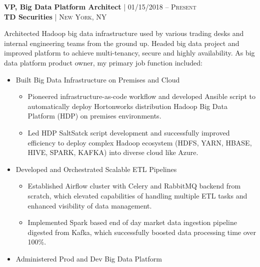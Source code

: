 {\raggedright\normalsize
\textbf{VP, Big Data Platform Architect} {\hfill\footnotesize\textsc{| 01/15/2018 -- Present}}\\ 
\textbf{TD Securities} {\hfill\footnotesize\textsc{| New York, NY}}}
\setlength\vspace{0pt}

\begin{flushleft}
Architected Hadoop big data infrastructure used by various trading desks and internal engineering teams from the ground up.
Headed big data project and improved platform to achieve multi-tenancy, secure and highly availability. 
As big data platform product owner, my primary job function included:  
\end{flushleft}

\begin{itemize}[leftmargin=*, topsep=1pt, partopsep=2.5pt]
\setlength\itemsep{-0.2em}

\item Built Big Data Infrastructure on Premises and Cloud

\begin{itemize}[leftmargin=*, topsep=-5pt, partopsep=2.5pt]
\setlength\itemsep{-0.2em}
\item Pioneered infrastructure-as-code workflow and developed Ansible script to automatically deploy Hortonworks distribution Hadoop Big Data Platform (HDP) on premises environments.  
\item Led HDP SaltSatck script development and successfully improved efficiency to deploy complex Hadoop ecosystem (HDFS, YARN, HBASE, HIVE, SPARK, KAFKA) into diverse cloud like Azure.
\end{itemize}

\item Developed and Orchestrated Scalable ETL Pipelines

\begin{itemize}[leftmargin=*, topsep=-5pt, partopsep=2.5pt]
\setlength\itemsep{-0.2em}
\item Established Airflow cluster with Celery and RabbitMQ backend from scratch, which elevated capabilities of handling multiple ETL tasks and enhanced visibility of data management.
\item Implemented Spark based end of day market data ingestion pipeline digested from Kafka, which successfully boosted data processing time over 100\%.
\end{itemize}

\item Administered Prod and Dev Big Data Platform


\end{itemize}
